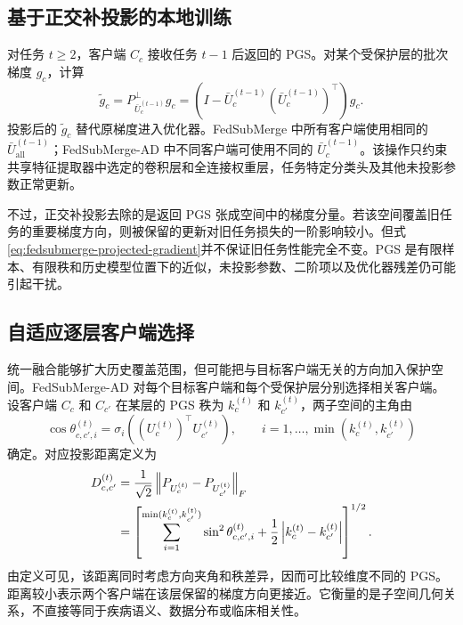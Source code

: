 \subsection{基于正交补投影的本地训练}
\label{subsec:fedsubmerge-local-projection}

对任务 $t\geq2$，客户端 $C_c$ 接收任务 $t-1$ 后返回的 PGS。对某个受保护层的批次梯度 $g_c$，计算
\begin{equation}
\widetilde g_c
=
P_{\bar U_c^{(t-1)}}^{\perp}g_c
=
\left(I-\bar U_c^{(t-1)}(\bar U_c^{(t-1)})^{\top}\right)g_c.
\label{eq:fedsubmerge-projected-gradient}
\end{equation}
投影后的 $\widetilde g_c$ 替代原梯度进入优化器。FedSubMerge 中所有客户端使用相同的 $\bar U_{\mathrm{all}}^{(t-1)}$；FedSubMerge-AD 中不同客户端可使用不同的 $\bar U_c^{(t-1)}$。该操作只约束共享特征提取器中选定的卷积层和全连接权重层，任务特定分类头及其他未投影参数正常更新。

不过，正交补投影去除的是返回 PGS 张成空间中的梯度分量。若该空间覆盖旧任务的重要梯度方向，则被保留的更新对旧任务损失的一阶影响较小。但式\eqref{eq:fedsubmerge-projected-gradient}并不保证旧任务性能完全不变。PGS 是有限样本、有限秩和历史模型位置下的近似，未投影参数、二阶项以及优化器残差仍可能引起干扰。

\subsection{自适应逐层客户端选择}
\label{subsec:fedsubmerge-adaptive-selection}

统一融合能够扩大历史覆盖范围，但可能把与目标客户端无关的方向加入保护空间。FedSubMerge-AD 对每个目标客户端和每个受保护层分别选择相关客户端。设客户端 $C_c$ 和 $C_{c'}$ 在某层的 PGS 秩为 $k_c^{(t)}$ 和 $k_{c'}^{(t)}$，两子空间的主角由
\begin{equation}
\cos\theta_{c,c',i}^{(t)}
=
\sigma_i\!\left((U_c^{(t)})^{\top}U_{c'}^{(t)}\right),
\qquad
 i=1,\ldots,\min(k_c^{(t)},k_{c'}^{(t)})
\label{eq:fedsubmerge-principal-angle}
\end{equation}
确定。对应投影距离定义为
\begin{align}
D_{c,c'}^{(t)}
&=
\frac{1}{\sqrt{2}}
\left\|P_{U_c^{(t)}}-P_{U_{c'}^{(t)}}\right\|_F
\notag\\
&=
\left[
\sum_{i=1}^{\min(k_c^{(t)},k_{c'}^{(t)})}
\sin^2\theta_{c,c',i}^{(t)}
+
\frac{1}{2}\left|k_c^{(t)}-k_{c'}^{(t)}\right|
\right]^{1/2}.
\label{eq:fedsubmerge-subspace-distance}
\end{align}
由定义可见，该距离同时考虑方向夹角和秩差异，因而可比较维度不同的 PGS。距离较小表示两个客户端在该层保留的梯度方向更接近。它衡量的是子空间几何关系，不直接等同于疾病语义、数据分布或临床相关性。

